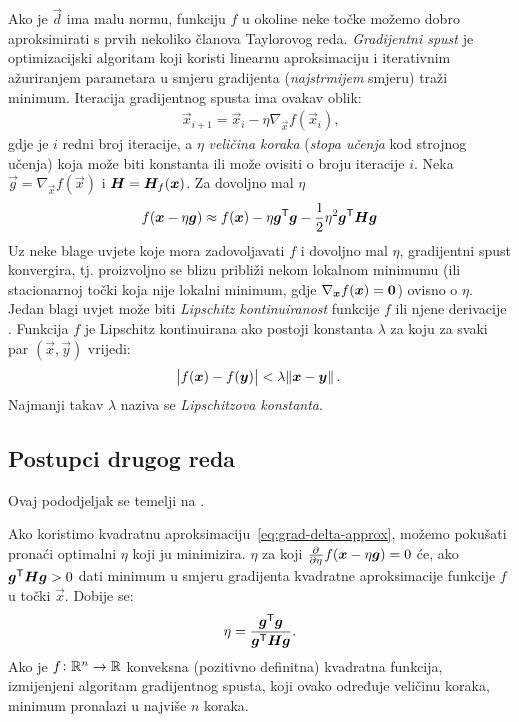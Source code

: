 \documentclass[utf8, diplomski, lmodern]{fer}
\begin{document}
Ako je $\vec d$ ima malu normu, funkciju $f$ u okoline neke točke možemo dobro aproksimirati s prvih nekoliko članova Taylorovog reda. \emph{Gradijentni spust} je optimizacijski algoritam koji koristi linearnu aproksimaciju i iterativnim ažuriranjem parametara u smjeru gradijenta (\textit{najstrmijem} smjeru) traži minimum. Iteracija gradijentnog spusta ima ovakav oblik:
\begin{align}
\vec x_{i+1} = \vec x_i - \eta\nabla_{\vec x}f(\vec x_i) \text{,}
\end{align}
gdje je $i$ redni broj iteracije, a $\eta$ \emph{veličina koraka} (\emph{stopa učenja} kod strojnog učenja) koja može biti konstanta ili može ovisiti o broju iteracije $i$. Neka $\vec g=\nabla_{\vec x}f(\vec x)$ i $\mat H=\mat H_f(\vec x)$. Za dovoljno mal $\eta$
\begin{align} \label{eq:grad-delta-approx}
f(\vec x-\eta\vec g) \approx f(\vec x) - \eta\vec g^\tp\vec g - \frac{1}{2}\eta^2\vec g^\tp\mat H\vec g
\end{align}
Uz neke blage uvjete koje mora zadovoljavati $f$ i dovoljno mal $\eta$, gradijentni spust konvergira, tj. proizvoljno se blizu približi nekom lokalnom minimumu (ili stacionarnoj točki koja nije lokalni minimum, gdje $\nabla_{\vec x}f(\vec x)=\cvec 0$) ovisno o $\eta$. Jedan blagi uvjet može biti \emph{Lipschitz kontinuiranost} funkcije $f$ ili njene derivacije \citep{Goodfellow:2016:DL}. Funkcija $f$ je Lipschitz kontinuirana ako postoji konstanta $\lambda$ za koju za svaki par $(\vec x,\vec y)$ vrijedi:
\begin{align}
\envert{f(\vec x)-f(\vec y)} < \lambda\enVert{\vec x-\vec y} \text{.}
\end{align}
Najmanji takav $\lambda$ naziva se \emph{Lipschitzova konstanta}.

\subsection{Postupci drugog reda}

Ovaj pododjeljak se temelji na \citet{Goodfellow:2016:DL}.

Ako koristimo kvadratnu aproksimaciju~\eqref{eq:grad-delta-approx}, možemo pokušati pronaći optimalni $\eta$ koji ju minimizira. $\eta$ za koji $\pd{}{\eta}f(\vec x-\eta\vec g)=0$ će, ako $\vec g^\tp\mat H\vec g>0$ dati minimum u smjeru gradijenta kvadratne aproksimacije funkcije $f$ u točki $\vec x$. Dobije se:
\begin{align}
\eta = \frac{\vec g^\tp \vec g}{\vec g^\tp\mat H\vec g} \text{.}
\end{align}
Ako je $f \colon \mathbb{R}^n \to \mathbb{R}$ konveksna (pozitivno definitna) kvadratna funkcija, izmijenjeni algoritam gradijentnog spusta, koji ovako određuje veličinu koraka, minimum pronalazi u najviše $n$ koraka. 
\end{document}
